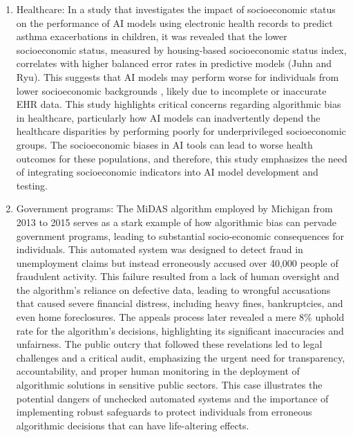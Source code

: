 \documentclass[10pt]{article}
\begin{document}
  \begin{enumerate}
    \item Healthcare: In a study that investigates the impact of socioeconomic status on the performance of AI models using electronic health records to predict asthma exacerbations in children, it was revealed that the lower socioeconomic status, measured by housing-based socioeconomic status index, correlates with higher balanced error rates in predictive models (Juhn  and Ryu). This suggests that AI models may perform worse for individuals from lower socioeconomic backgrounds , likely due to incomplete or inaccurate EHR data. This study highlights critical concerns regarding algorithmic bias in healthcare, particularly how AI models can inadvertently depend the healthcare disparities by performing poorly for underprivileged socioeconomic groups. The socioeconomic biases in AI tools can lead to worse health outcomes for these populations, and therefore, this study emphasizes the need of integrating socioeconomic indicators into AI model development and testing. 
    \item Government programs: The MiDAS algorithm employed by Michigan from 2013 to 2015 serves as a stark example of how algorithmic bias can pervade government programs, leading to substantial socio-economic consequences for individuals. This automated system was designed to detect fraud in unemployment claims but instead erroneously accused over 40,000 people of fraudulent activity. This failure resulted from a lack of human oversight and the algorithm’s reliance on defective data, leading to wrongful accusations that caused severe financial distress, including heavy fines, bankruptcies, and even home foreclosures. The appeals process later revealed a mere 8\% uphold rate for the algorithm’s decisions, highlighting its significant inaccuracies and unfairness. The public outcry that followed these revelations led to legal challenges and a critical audit, emphasizing the urgent need for transparency, accountability, and proper human monitoring in the deployment of algorithmic solutions in sensitive public sectors. This case illustrates the potential dangers of unchecked automated systems and the importance of implementing robust safeguards to protect individuals from erroneous algorithmic decisions that can have life-altering effects.

\end{enumerate}
\end{document}
